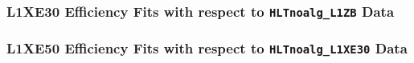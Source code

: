 \documentclass[]{beamer}
\begin{document}
\begin{frame}
        \frametitle{L1XE30 Efficiency Fits with respect to \texttt{HLTnoalg\_L1ZB} Data}
\end{frame}
\begin{frame}
        \frametitle{L1XE50 Efficiency Fits with respect to \texttt{HLTnoalg\_L1XE30} Data}
\end{frame}
\begin{frame}

\end{frame}
\end{document}
